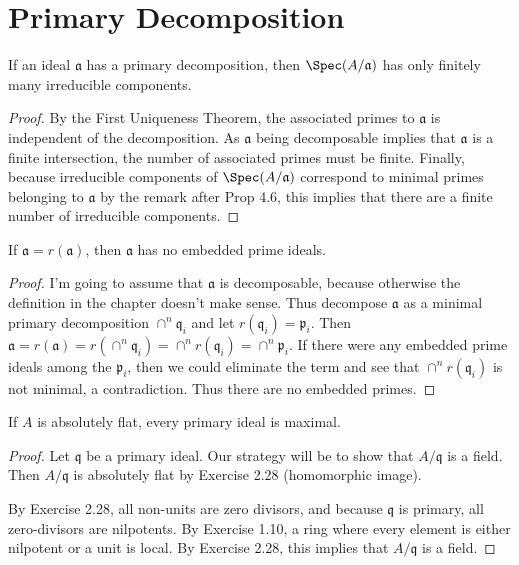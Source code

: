\newif\ifhint
\hinttrue
\section{Primary Decomposition}

\begin{exercise}
	If an ideal $\mathfrak{a}$ has a primary decomposition, then $\Spec(A/\mathfrak{a})$ has only finitely many irreducible components.
\end{exercise}
\begin{proof}
	By the First Uniqueness Theorem, the associated primes to $\mathfrak{a} $ is independent of the decomposition.
	As $\mathfrak{a} $ being decomposable implies that $\mathfrak{a} $ is a finite intersection, the number of associated primes must be finite.
	Finally, because irreducible components of $\Spec(A / \mathfrak{a}) $ correspond to minimal primes belonging to $\mathfrak{a} $ by the remark after Prop 4.6, this implies that there are a finite number of irreducible components.
\end{proof}

\begin{exercise}
	If $\mathfrak{a} = r(\mathfrak{a})$, then $\mathfrak{a}$ has no embedded prime ideals. 
\end{exercise}
\begin{proof}
	I'm going to assume that $\mathfrak{a} $ is decomposable, because otherwise the definition in the chapter doesn't make sense.
	Thus decompose $\mathfrak{a} $ as a minimal primary decomposition $\cap^n \mathfrak{q}_i $ and let $r(\mathfrak{q}_i) = \mathfrak{p}_i $.
	Then $\mathfrak{a} = r(\mathfrak{a}) = r(\cap^n \mathfrak{q}_i) = \cap^n r(\mathfrak{q}_i) = \cap^n \mathfrak{p}_i$.
	If there were any embedded prime ideals among the $\mathfrak{p}_i $, then we could eliminate the term and see that $\cap^n r(\mathfrak{q}_i) $ is not minimal, a contradiction.
	Thus there are no embedded primes.
\end{proof}

\begin{exercise}
	If $A$ is absolutely flat, every primary ideal is maximal. 
\end{exercise}
\begin{proof}
	Let $\mathfrak{q} $ be a primary ideal.
	Our strategy will be to show that $A / \mathfrak{q} $ is a field.
	Then $A / \mathfrak{q} $ is absolutely flat by Exercise 2.28 (homomorphic image).

	By Exercise 2.28, all non-units are zero divisors, and because $\mathfrak{q} $ is primary, all zero-divisors are nilpotents.
	By Exercise 1.10, a ring where every element is either nilpotent or a unit is local.
	By Exercise 2.28, this implies that $A / \mathfrak{q} $ is a field.
\end{proof}

